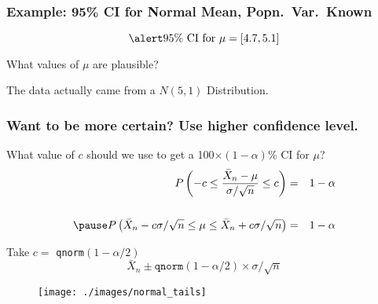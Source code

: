 \begin{frame}
\frametitle{Example: 95\% CI for Normal Mean, Popn.\ Var.\ Known}

\begin{center}
\end{center}

	$$\alert{\mbox{95\% CI for } \mu = [4.7, 5.1]}$$

What values of $\mu$ are plausible?

\pause
\vspace{1em}

\alert{The data actually came from a $N(5,1)$ Distribution.}

\end{frame}
\begin{frame}
\frametitle{Want to be more certain? Use higher confidence level.}
What value of $c$ should we use to get a 100$\times(1-\alpha)$\% CI for $\mu$?
	\begin{eqnarray*}
		P\left(-c \leq \frac{\bar{X}_n-\mu}{\sigma/\sqrt{n}} \leq c \right) &=& 1-\alpha \\ \\ \pause
		P\left(\bar{X}_n - c \sigma/\sqrt{n} \leq \mu\leq \bar{X}_n + c \sigma/\sqrt{n} \right) &=& 1-\alpha 
	\end{eqnarray*}
 \pause

\alert{Take $c =$ \texttt{qnorm}$(1-\alpha/2)$} \pause
	$$\bar{X}_n \pm \texttt{qnorm}(1-\alpha/2) \times \sigma/\sqrt{n}$$
\end{frame}
\begin{frame}
\begin{figure}
\centering
\texttt{[image: ./images/normal\_tails]}
\end{figure}
\end{frame}
